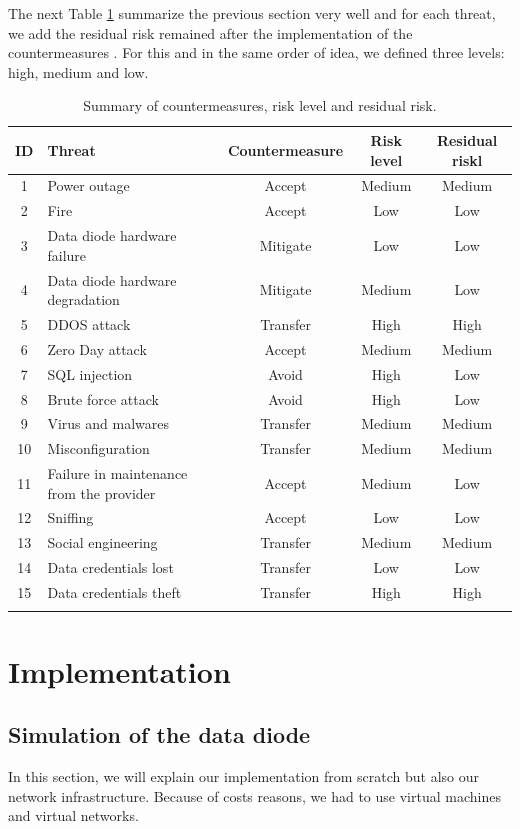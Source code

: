 \documentclass[a4paper,10pt]{article}
\begin{document}
The next Table \ref{tab:riskresid} summarize the previous section very well and for each threat, we add the residual risk remained after the implementation of the countermeasures . For this and in the same order of idea, we defined three levels: high, medium and low.
\begin{longtable}{|c|p{4cm}|c|c|c|}
	\hline
	\textbf{ID}& \textbf{Threat}  & \textbf{Countermeasure} & \textbf{Risk level} & \textbf{Residual riskl}          \\
	\hline
	1 & Power outage & Accept & Medium & Medium \\
	\hline
	2 & Fire  & Accept & Low & Low \\
	\hline
	3 & Data diode hardware failure & Mitigate & Low & Low \\
	\hline
	4 & Data diode hardware degradation & Mitigate & Medium & Low  \\
	\hline
	5 & DDOS attack & Transfer & High & High \\
	\hline
	6 & Zero Day attack & Accept & Medium & Medium \\
	\hline
	7 &  SQL injection & Avoid & High & Low \\
	\hline
	8 & Brute force attack & Avoid & High & Low \\
	\hline
	9 & Virus and malwares & Transfer & Medium & Medium \\
	\hline
	10 & Misconfiguration & Transfer & Medium & Medium \\
	\hline
	11 & Failure in maintenance from the provider & Accept & Medium & Low \\
	\hline
	12 & Sniffing & Accept & Low & Low \\
	\hline
	13 & Social engineering & Transfer & Medium & Medium \\
	\hline
	14 & Data credentials lost & Transfer & Low & Low \\
	\hline
	15 & Data credentials theft & Transfer & High & High \\
	\hline
	\caption{Summary of countermeasures, risk level and residual risk.}
	\label{tab:riskresid}
\end{longtable}

\section{Implementation}
\subsection{Simulation of the data diode}
In this section, we will explain our implementation from scratch but also our network infrastructure. Because of costs reasons, we had to use virtual machines and virtual networks. 
\end{document}
